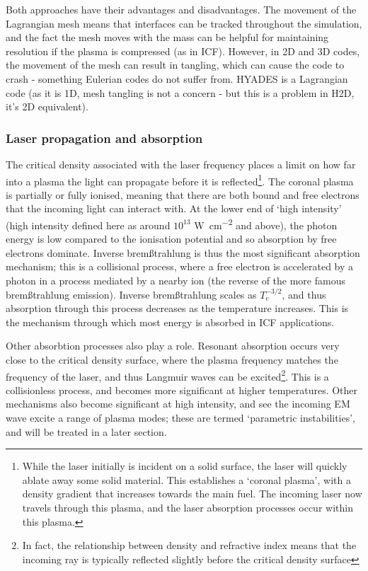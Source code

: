 Both approaches have their advantages and disadvantages. The movement of the Lagrangian mesh means that interfaces can be tracked throughout the simulation, and the fact the mesh moves with the mass can be helpful for maintaining resolution if the plasma is compressed (as in ICF). However, in 2D and 3D codes, the movement of the mesh can result in tangling, which can cause the code to crash - something Eulerian codes do not suffer from. HYADES is a Lagrangian code (as it is 1D, mesh tangling is not a concern - but this is a problem in H2D, it's 2D equivalent).

\subsubsection{Laser propagation and absorption}
The critical density  associated with the laser frequency places a limit on how far into a plasma the light can propagate before it is reflected\footnote{While the laser initially is incident on a solid surface, the laser will quickly ablate away some solid material. This establishes a `coronal plasma', with a density gradient that increases towards the main fuel. The incoming laser now travels through this plasma, and the laser absorption processes occur within this plasma.}. The coronal plasma is partially or fully ionised, meaning that there are both bound and free electrons that the incoming light can interact with. At the lower end of `high intensity' (high intensity defined here as around $10^{13}$ \unit{\watt\per\centi\meter\squared} and above), the photon energy is low compared to the ionisation potential and so absorption by free electrons dominate. Inverse brem{\ss}trahlung is thus the most significant absorption mechanism; this is a collisional process, where a free electron is accelerated by a photon in a process mediated by a nearby ion (the reverse of the more famous brem{\ss}trahlung emission). Inverse brem{\ss}trahlung scales as $T_e^{-3/2}$, and thus absorption through this process decreases as the temperature increases. This is the mechanism through which most energy is absorbed in ICF applications.

Other absorbtion processes also play a role. Resonant absorption occurs very close to the critical density surface, where the plasma frequency matches the frequency of the laser, and thus Langmuir waves can be excited\footnote{In fact, the relationship between density and refractive index means that the incoming ray is typically reflected slightly before the critical density surface}. This is a collisionless process, and becomes more significant at higher temperatures. Other mechanisms also become significant at high intensity, and see the incoming EM wave excite a range of plasma modes; these are termed `parametric instabilities', and will be treated in a later section.

